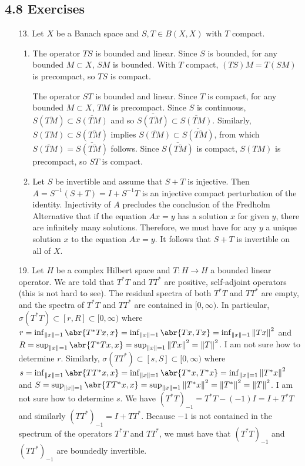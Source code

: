 \documentclass[11pt,leqno]{article}
\theoremstyle{plain}
\theoremstyle{definition}
\numberwithin{equation}{section}
\numberwithin{lem}{section}
\begin{document}
\subsection*{4.8 Exercises}
\begin{enumerate}
    \item[13.] Let $X$ be a Banach space and $S,T\in B(X,X)$ with $T$ compact.
    \begin{enumerate}
        \item The operator $TS$ is bounded and linear. Since $S$ is bounded, for any bounded $M\subset X$, $SM$ is bounded. With $T$ compact, $(TS)M = T(SM)$ is precompact, so $TS$ is compact.
        
        The operator $ST$ is bounded and linear. Since $T$ is compact, for any bounded $M\subset X$, $TM$ is precompact. Since $S$ is continuous, $S(\overline{TM})\subset \overline{S(TM)}$ and so $\overline{S(\overline{TM})}\subset \overline{S(TM)}$. Similarly, $S(TM)\subset S(\overline{TM})$ implies $\overline{S(TM)}\subset \overline{S(\overline{TM})}$, from which $\overline{S(TM)}= \overline{S(\overline{TM})}$ follows. Since $\overline{S(\overline{TM})}$ is compact, $S(TM)$ is precompact, so $ST$ is compact.
        \item Let $S$ be invertible and assume that $S+T$ is injective. Then $A= S^{-1}(S+T) = I+S^{-1}T$ is an injective compact perturbation of the identity. Injectivity of $A$ precludes the conclusion of the Fredholm Alternative that if the equation $Ax=y$ has a solution $x$ for given $y$, there are infinitely many solutions. Therefore, we must have for any $y$ a unique solution $x$ to the equation $Ax=y$. It follows that $S+T$ is invertible on all of $X$.
    \end{enumerate}
    \item[19.] Let $H$ be a complex Hilbert space and $T\colon H\to H$ a bounded linear operator. We are told that $T^\ast T$ and $TT^\ast$ are positive, self-adjoint operators (this is not hard to see). The residual spectra of both $T^\ast T$ and $TT^\ast$ are empty, and the spectra of $T^\ast T$ and $TT^\ast$ are contained in $[0,\infty)$. In particular, $\sigma(T^\ast T)\subset [r,R]\subset [0,\infty)$ where $r = \inf_{\norm{x} =1}\abr{T^\ast Tx, x} = \inf_{\norm{x} =1}\abr{Tx, Tx} = \inf_{\norm{x} =1}\norm{Tx}^2$ and $R = \sup_{\norm{x}=1}\abr{T^\ast Tx,x} = \sup_{\norm{x}=1}\norm{Tx}^2 = \norm{T}^2$. I am not sure how to determine $r$. Similarly, $\sigma(TT^\ast)\subset [s,S]\subset [0,\infty)$ where $s = \inf_{\norm{x} =1}\abr{TT^\ast x, x} = \inf_{\norm{x} =1}\abr{T^\ast x, T^\ast x} = \inf_{\norm{x} =1}\norm{T^\ast x}^2$ and $S = \sup_{\norm{x}=1}\abr{TT^\ast x,x} = \sup_{\norm{x}=1}\norm{T^\ast x}^2 = \norm{T^\ast }^2 = \norm{T}^2$. I am not sure how to determine $s$. We have $(T^\ast T)_{-1} = T^\ast T - (-1)I = I+T^\ast T$ and similarly $(TT^\ast)_{-1} = I+TT^\ast$. Because $-1$ is not contained in the spectrum of the operators $T^\ast T$ and $TT^\ast$, we must have that $(T^\ast T)_{-1}$ and $(TT^\ast)_{-1}$ are boundedly invertible.

\end{enumerate}
\end{document}
